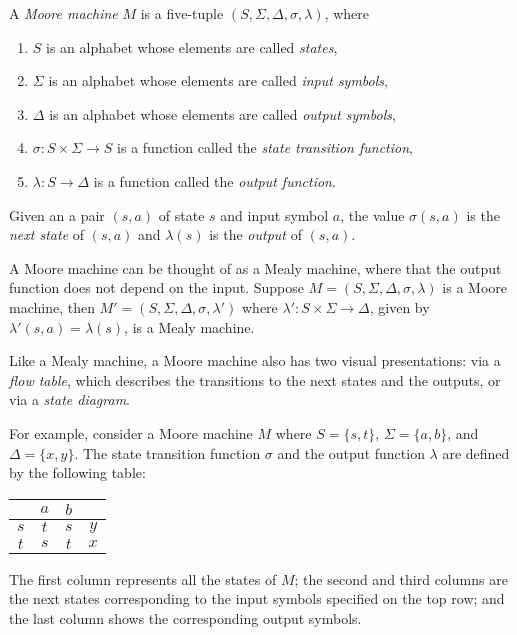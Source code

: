 \documentclass[12pt]{article}
\begin{document}
A \emph{Moore machine} $M$ is a five-tuple $(S,\Sigma,\Delta,\sigma,\lambda)$, where
\begin{enumerate}
\item $S$ is an alphabet whose elements are called \emph{states},
\item $\Sigma$ is an alphabet whose elements are called \emph{input symbols},
\item $\Delta$ is an alphabet whose elements are called \emph{output symbols},
\item $\sigma: S\times \Sigma \to S$ is a function called the \emph{state transition function},
\item $\lambda: S \to \Delta$ is a function called the \emph{output function}.
\end{enumerate}
Given an a pair $(s,a)$ of state $s$ and input symbol $a$, the value $\sigma(s,a)$ is the \emph{next state} of $(s,a)$ and $\lambda(s)$ is the \emph{output} of $(s,a)$.

A Moore machine can be thought of as a Mealy machine, where that the output function does not depend on the input.  Suppose $M=(S,\Sigma,\Delta,\sigma,\lambda)$ is a Moore machine, then $M'=(S,\Sigma, \Delta,\sigma,\lambda')$ where $\lambda':S\times \Sigma \to \Delta$, given by $\lambda'(s,a)=\lambda(s)$, is a Mealy machine.

Like a Mealy machine, a Moore machine also has two visual presentations: via a \emph{flow table}, which describes the transitions to the next states and the outputs, or via a \emph{state diagram}.

For example, consider a Moore machine $M$ where $S=\lbrace s,t\rbrace$, $\Sigma = \lbrace a,b\rbrace$, and $\Delta = \lbrace x,y\rbrace$.  The state transition function $\sigma$ and the output function $\lambda$ are defined by the following table:

\begin{center}
\begin{tabular}{|c||c|c||c|}
\hline
& $a$ & $b$ &  \\
\hline\hline
$s$ & $t$ & $s$ & $y$  \\
\hline
$t$ & $s$ & $t$ & $x$  \\
\hline
\end{tabular}
\end{center}
The first column represents all the states of $M$; the second and third columns are the next states corresponding to the input symbols specified on the top row; and the last column shows the corresponding output symbols.
\end{document}
